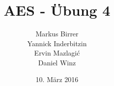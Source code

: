 \documentclass[a4,paper,fleqn]{article}
\title{AES - Übung 4}
\date{10. März 2016}
\author{Markus Birrer \\
        Yannick Inderbitzin\\
        Ervin Mazlagi\'c\\
        Daniel Winz}
\begin{document}
\maketitle
\vfill
\tableofcontents
\vfill
\clearpage
\end{document}
